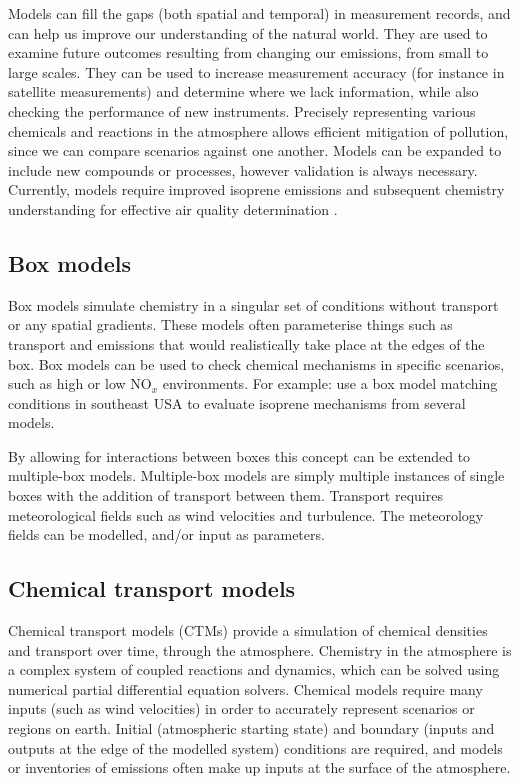   Models can fill the gaps (both spatial and temporal) in measurement records, and can help us improve our understanding of the natural world.
  They are used to examine future outcomes resulting from changing our emissions, from small to large scales.
  They can be used to increase measurement accuracy (for instance in satellite measurements) and determine where we lack information, while also checking the performance of new instruments.
  Precisely representing various chemicals and reactions in the atmosphere allows efficient mitigation of pollution, since we can compare scenarios against one another.
  Models can be expanded to include new compounds or processes, however validation is always necessary.
  Currently, models require improved isoprene emissions and subsequent chemistry understanding for effective air quality determination \parencite{Marvin2017}.
  
  
  \subsection{Box models}
    
    Box models simulate chemistry in a singular set of conditions without transport or any spatial gradients.
    These models often parameterise things such as transport and emissions that would realistically take place at the edges of the box.
    Box models can be used to check chemical mechanisms in specific scenarios, such as high or low NO$_x$ environments.
    For example: \textcite{Marvin2017} use a box model matching conditions in southeast USA to evaluate isoprene mechanisms from several models.  
    
    By allowing for interactions between boxes this concept can be extended to multiple-box models.
    Multiple-box models are simply multiple instances of single boxes with the addition of transport between them.
    Transport requires meteorological fields such as wind velocities and turbulence.
    The meteorology fields can be modelled, and/or input as parameters.
  
  
  \subsection{Chemical transport models}
    \label{LR:Models:ctm}
    Chemical transport models (CTMs) provide a simulation of chemical densities and transport over time, through the atmosphere.
    Chemistry in the atmosphere is a complex system of coupled reactions and dynamics, which can be solved using numerical partial differential equation solvers.
    Chemical models require many inputs (such as wind velocities) in order to accurately represent scenarios or regions on earth.
    Initial (atmospheric starting state) and boundary (inputs and outputs at the edge of the modelled system) conditions are required, and models or inventories of emissions often make up inputs at the surface of the atmosphere.
    
